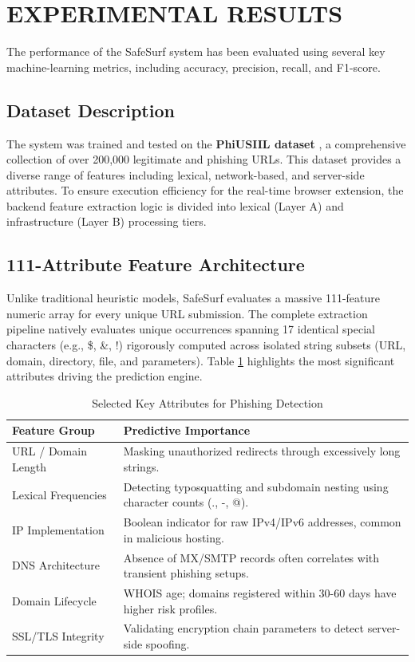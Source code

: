 \section{EXPERIMENTAL RESULTS}
\label{sec:results}

The performance of the SafeSurf system has been evaluated using several key machine-learning metrics, including accuracy, precision, recall, and F1-score. 

\subsection{Dataset Description}
The system was trained and tested on the \textbf{PhiUSIIL dataset} \cite{ref10}, a comprehensive collection of over 200,000 legitimate and phishing URLs. This dataset provides a diverse range of features including lexical, network-based, and server-side attributes. To ensure execution efficiency for the real-time browser extension, the backend feature extraction logic is divided into lexical (Layer A) and infrastructure (Layer B) processing tiers.

\subsection{111-Attribute Feature Architecture}
Unlike traditional heuristic models, SafeSurf evaluates a massive 111-feature numeric array for every unique URL submission. The complete extraction pipeline natively evaluates unique occurrences spanning 17 identical special characters (e.g., \$, \&, !) rigorously computed across isolated string subsets (URL, domain, directory, file, and parameters). Table \ref{tab:features} highlights the most significant attributes driving the prediction engine.

\begin{table}[ht]
    \centering
    \caption{Selected Key Attributes for Phishing Detection}
    \label{tab:features}
    \renewcommand{\arraystretch}{1.3}
    \begin{tabular}{|p{2.5cm}|p{5cm}|}
    \hline
    \textbf{Feature Group} & \textbf{Predictive Importance} \\
    \hline
    URL / Domain Length & Masking unauthorized redirects through excessively long strings. \\
    \hline
    Lexical Frequencies & Detecting typosquatting and subdomain nesting using character counts (., -, @). \\
    \hline
    IP Implementation & Boolean indicator for raw IPv4/IPv6 addresses, common in malicious hosting. \\
    \hline
    DNS Architecture & Absence of MX/SMTP records often correlates with transient phishing setups. \\
    \hline
    Domain Lifecycle & WHOIS age; domains registered within 30-60 days have higher risk profiles. \\
    \hline
    SSL/TLS Integrity & Validating encryption chain parameters to detect server-side spoofing. \\
    \hline
    \end{tabular}
\end{table}

